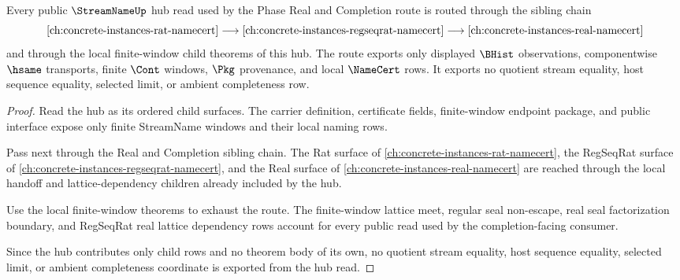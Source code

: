 \begin{theorem}
\label{thm:streamname-hub-real-completion-lattice-pointer}
Every public $\StreamNameUp$ hub read used by the Phase Real and Completion route is routed through the sibling chain
$$
\autoref{ch:concrete-instances-rat-namecert}
\longrightarrow
\autoref{ch:concrete-instances-regseqrat-namecert}
\longrightarrow
\autoref{ch:concrete-instances-real-namecert}
$$
and through the local finite-window child theorems of this hub. The route exports only displayed $\BHist$ observations, componentwise $\hsame$ transports, finite $\Cont$ windows, $\Pkg$ provenance, and local $\NameCert$ rows. It exports no quotient stream equality, host sequence equality, selected limit, or ambient completeness row.
\end{theorem}
\begin{proof}
Read the hub as its ordered child surfaces. The carrier definition, certificate fields, finite-window endpoint package, and public interface expose only finite StreamName windows and their local naming rows.

Pass next through the Real and Completion sibling chain. The Rat surface of \autoref{ch:concrete-instances-rat-namecert}, the RegSeqRat surface of \autoref{ch:concrete-instances-regseqrat-namecert}, and the Real surface of \autoref{ch:concrete-instances-real-namecert} are reached through the local handoff and lattice-dependency children already included by the hub.

Use the local finite-window theorems to exhaust the route. The finite-window lattice meet, regular seal non-escape, real seal factorization boundary, and RegSeqRat real lattice dependency rows account for every public read used by the completion-facing consumer.

Since the hub contributes only child rows and no theorem body of its own, no quotient stream equality, host sequence equality, selected limit, or ambient completeness coordinate is exported from the hub read.
\end{proof}
